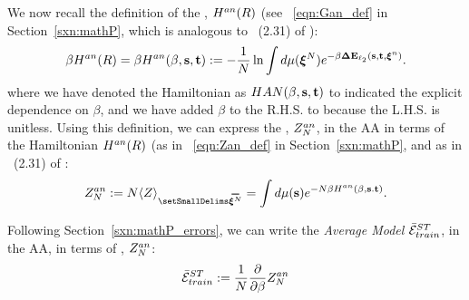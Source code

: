 We now recall the definition of the \AnnealedHamiltonian, $H^{an}(R)$ (see \EQN~\ref{eqn:Gan_def} in Section~\ref{sxn:mathP}, which is analogous to \EQN~(2.31) of \cite{SST92}):
\begin{align}
\label{eqn:Gan0}
\beta H^{an}(R) = \beta H^{an}(\beta,{\mathbf{s}},{\mathbf{t}}):=-\frac{1}{N}\ln \int d\mu(\boldsymbol{\xi}^{N})e^{-\beta\mathbf{\Delta {E}}_{\ell_2}({\mathbf{s}},{\mathbf{t}}, \boldsymbol{\xi}^{n})}  .
\end{align}
where we have denoted the Hamiltonian as $HAN(\beta,{\mathbf{s}},{\mathbf{t}})$ to indicated the explicit dependence on $\beta$,
and we have added $\beta$ to the R.H.S. to because the L.H.S. is unitless.
%
Using this definition, we can express the \Annealed \PartitionFunction, $Z^{an}_{N}$, in the AA in terms of the \Annealed Hamiltonian $H^{an}(R)$
(as in \EQN~\ref{eqn:Zan_def} in Section~\ref{sxn:mathP}, and as in \EQN~(2.31) of \cite{SST92}:
\begin{align}
 \label{eqn:Zan}
Z^{an}_{\ND}:=\ND\langle Z\rangle_{\AVGNDXI}=\int d\mu(\SVEC)e^{-\ND\beta\HAN(\beta,\SVEC.\TVEC)}  .
\end{align}

Following Section~\ref{sxn:mathP_errors}, we can write the \emph{Average Model \TrainingError} $\bar{\mathcal{E}}^{ST}_{train}$, in the AA,
in terms of \Annealed \PartitionFunction, $Z^{an}_{N}$:
\begin{align}
 \label{eqn:AVGSTTE_AA}
\bar{\mathcal{E}}^{ST}_{train}:= \frac{1}{N}\dfrac{\partial }{\partial \beta} Z^{an}_{N}
\end{align}

